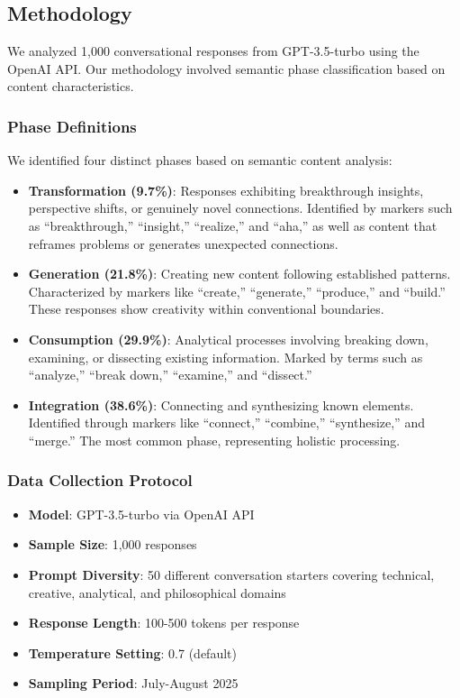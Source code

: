 \documentclass[pmlr,onecolumn]{jmlr}
\begin{document}
\subsection{Methodology}

We analyzed 1,000 conversational responses from GPT-3.5-turbo using the OpenAI API. Our methodology involved semantic phase classification based on content characteristics.

\subsubsection{Phase Definitions}

We identified four distinct phases based on semantic content analysis:

\begin{itemize}
\item \textbf{Transformation (9.7\%)}: Responses exhibiting breakthrough insights, perspective shifts, or genuinely novel connections. Identified by markers such as ``breakthrough,'' ``insight,'' ``realize,'' and ``aha,'' as well as content that reframes problems or generates unexpected connections.

\item \textbf{Generation (21.8\%)}: Creating new content following established patterns. Characterized by markers like ``create,'' ``generate,'' ``produce,'' and ``build.'' These responses show creativity within conventional boundaries.

\item \textbf{Consumption (29.9\%)}: Analytical processes involving breaking down, examining, or dissecting existing information. Marked by terms such as ``analyze,'' ``break down,'' ``examine,'' and ``dissect.''

\item \textbf{Integration (38.6\%)}: Connecting and synthesizing known elements. Identified through markers like ``connect,'' ``combine,'' ``synthesize,'' and ``merge.'' The most common phase, representing holistic processing.
\end{itemize}

\subsubsection{Data Collection Protocol}

\begin{itemize}
\item \textbf{Model}: GPT-3.5-turbo via OpenAI API
\item \textbf{Sample Size}: 1,000 responses
\item \textbf{Prompt Diversity}: 50 different conversation starters covering technical, creative, analytical, and philosophical domains
\item \textbf{Response Length}: 100-500 tokens per response
\item \textbf{Temperature Setting}: 0.7 (default)
\item \textbf{Sampling Period}: July-August 2025
\end{itemize}
\end{document}
